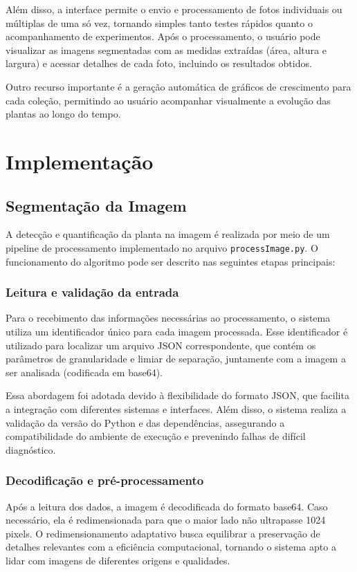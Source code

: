 Além disso, a interface permite o envio e processamento de fotos individuais ou múltiplas de uma só vez, tornando simples tanto testes rápidos quanto o acompanhamento de experimentos. Após o processamento, o usuário pode visualizar as imagens segmentadas com as medidas extraídas (área, altura e largura) e acessar detalhes de cada foto, incluindo os resultados obtidos.

Outro recurso importante é a geração automática de gráficos de crescimento para cada coleção, permitindo ao usuário acompanhar visualmente a evolução das plantas ao longo do tempo.

\section{Implementação}

\subsection{Segmentação da Imagem}

A detecção e quantificação da planta na imagem é realizada por meio de um pipeline de processamento implementado no arquivo \texttt{processImage.py}. O funcionamento do algoritmo pode ser descrito nas seguintes etapas principais:

\subsubsection{Leitura e validação da entrada}
Para o recebimento das informações necessárias ao processamento, o sistema utiliza um identificador único para cada imagem processada. Esse identificador é utilizado para localizar um arquivo JSON correspondente, que contém os parâmetros de granularidade e limiar de separação, juntamente com a imagem a ser analisada (codificada em base64).

Essa abordagem foi adotada devido à flexibilidade do formato JSON, que facilita a integração com diferentes sistemas e interfaces. Além disso, o sistema realiza a validação da versão do Python e das dependências, assegurando a compatibilidade do ambiente de execução e prevenindo falhas de difícil diagnóstico.

\subsubsection{Decodificação e pré-processamento}
Após a leitura dos dados, a imagem é decodificada do formato base64. Caso necessário, ela é redimensionada para que o maior lado não ultrapasse 1024 pixels. O redimensionamento adaptativo busca equilibrar a preservação de detalhes relevantes com a eficiência computacional, tornando o sistema apto a lidar com imagens de diferentes origens e qualidades.

